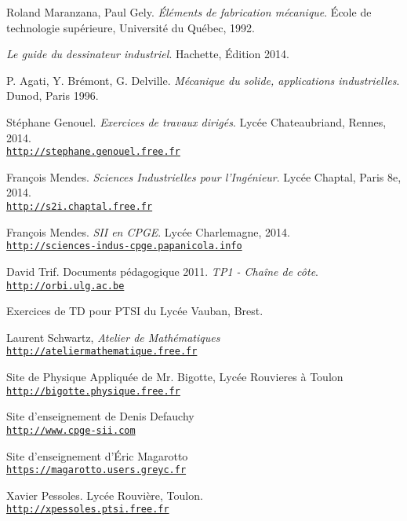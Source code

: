 \begin{thebibliography}{9}

 Roland Maranzana, Paul Gely. \textit{Éléments de fabrication mécanique}. École de technologie supérieure, Université du Québec, 1992.

 \textit{Le guide du dessinateur industriel}. Hachette, Édition 2014.

 P. Agati, Y. Brémont, G. Delville. \textit{Mécanique du solide, applications industrielles}. Dunod, Paris 1996.

 Stéphane Genouel. \textit{Exercices de travaux dirigés}. Lycée Chateaubriand, Rennes, 2014. \\\texttt{\url{http://stephane.genouel.free.fr}}

 François Mendes. \textit{Sciences Industrielles pour l'Ingénieur}. Lycée Chaptal, Paris 8e, 2014. \\\texttt{\url{http://s2i.chaptal.free.fr}}

 François Mendes. \textit{SII en CPGE}. Lycée Charlemagne, 2014. \\\texttt{\url{http://sciences-indus-cpge.papanicola.info}}

 David Trif. Documents pédagogique 2011. \textit{TP1 - Chaîne de côte}. \\\texttt{\url{http://orbi.ulg.ac.be}}

 Exercices de TD pour PTSI du Lycée Vauban, Brest.

 Laurent Schwartz, \textit{Atelier de Mathématiques} \\\texttt{\url{http://ateliermathematique.free.fr}}

\bibitem{} Site de Physique Appliquée de Mr. Bigotte, Lycée Rouvieres à Toulon\\\texttt{\url{http://bigotte.physique.free.fr}}

\bibitem{} Site d'enseignement de Denis Defauchy \\\texttt{\url{http://www.cpge-sii.com}}

\bibitem{} Site d'enseignement d'Éric Magarotto\\
\texttt{\url{https://magarotto.users.greyc.fr}}

\bibitem{} Xavier Pessoles. Lycée Rouvière, Toulon.\\
\texttt{\url{http://xpessoles.ptsi.free.fr}}

\end{thebibliography}